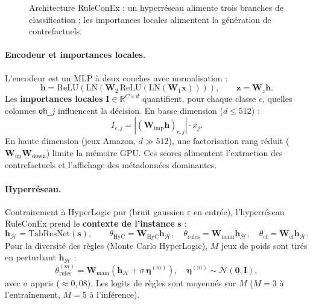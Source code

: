\documentclass[12pt,a4paper]{article}
\begin{document}
\begin{figure}[htbp]
\centering
{}
\caption{Architecture RuleConEx : un hyperr\'eseau alimente trois branches de classification ; les importances locales alimentent la g\'en\'eration de contrefactuels.}
\label{fig:ruleconex-arch}
\end{figure}

\paragraph{Encodeur et importances locales.}
L'encodeur est un MLP \`a deux couches avec normalisation :
\[
\bm{h}=\mathrm{ReLU}(\mathrm{LN}(\bm{W}_2\,\mathrm{ReLU}(\mathrm{LN}(\bm{W}_1\bm{x})))),\qquad
\bm{z}=\bm{W}_z\bm{h}.
\]
Les \textbf{importances locales} $\bm{I}\in\mathbb{R}^{C\times d}$ quantifient, pour chaque classe $c$, quelles colonnes \texttt{oh\_$j$} influencent la d\'ecision. En basse dimension ($d\leq512$) :
\[
I_{c,j}=\left|(\bm{W}_{\mathrm{imp}}\bm{h})_{c,j}\right|\cdot x_j.
\]
En haute dimension (jeux Amazon, $d\gg512$), une factorisation rang r\'eduit ($\bm{W}_{\mathrm{up}}\bm{W}_{\mathrm{down}}$) limite la m\'emoire GPU. Ces scores alimentent l'extraction des contrefactuels et l'affichage des m\'etadonn\'ees dominantes.

\paragraph{Hyperr\'eseau.}
Contrairement \`a HyperLogic pur (bruit gaussien $\varepsilon$ en entr\'ee), l'hyperr\'eseau RuleConEx prend le \textbf{contexte de l'instance} $\bm{s}$ :
\[
\bm{h}_{\mathcal{H}}=\mathrm{TabResNet}(\bm{s}),\qquad
\theta_{\mathrm{HyC}}=\bm{W}_{\mathrm{HyC}}\bm{h}_{\mathcal{H}},\quad
\theta_{\mathrm{rules}}=\bm{W}_{\mathrm{main}}\bm{h}_{\mathcal{H}},\quad
\theta_{\mathrm{cf}}=\bm{W}_{\mathrm{cf}}\bm{h}_{\mathcal{H}}.
\]
Pour la diversit\'e des r\`egles (Monte Carlo HyperLogic), $M$ jeux de poids sont tir\'es en perturbant $\bm{h}_{\mathcal{H}}$ :
\[
\theta_{\mathrm{rules}}^{(m)}=\bm{W}_{\mathrm{main}}\!\left(\bm{h}_{\mathcal{H}}+\sigma\,\bm{\eta}^{(m)}\right),\quad
\bm{\eta}^{(m)}\sim\mathcal{N}(\bm{0},\bm{I}),
\]
avec $\sigma$ appris ($\approx 0{,}08$). Les logits de r\`egles sont moyenn\'es sur $M$ ($M=3$ \`a l'entra\^inement, $M=5$ \`a l'inf\'erence).
\end{document}
